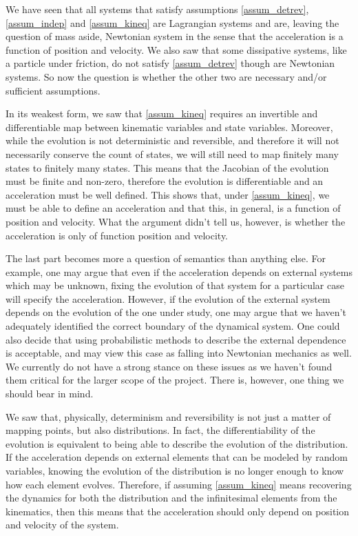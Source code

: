 We have seen that all systems that satisfy assumptions \ref{assum_detrev}, \ref{assum_indep} and \ref{assum_kineq} are Lagrangian systems and are, leaving the question of mass aside, Newtonian system in the sense that the acceleration is a function of position and velocity. We also saw that some dissipative systems, like a particle under friction, do not satisfy \ref{assum_detrev} though are Newtonian systems. So now the question is whether the other two are necessary and/or sufficient assumptions.

In its weakest form, we saw that \ref{assum_kineq} requires an invertible and differentiable map between kinematic variables and state variables. Moreover, while the evolution is not deterministic and reversible, and therefore it will not necessarily conserve the count of states, we will still need to map finitely many states to finitely many states. This means that the Jacobian of the evolution must be finite and non-zero, therefore the evolution is differentiable and an acceleration must be well defined. This shows that, under \ref{assum_kineq}, we must be able to define an acceleration and that this, in general, is a function of position and velocity. What the argument didn't tell us, however, is whether the acceleration is only of function position and velocity.

The last part becomes more a question of semantics than anything else. For example, one may argue that even if the acceleration depends on external systems which may be unknown, fixing the evolution of that system for a particular case will specify the acceleration. However, if the evolution of the external system depends on the evolution of the one under study, one may argue that we haven't adequately identified the correct boundary of the dynamical system. One could also decide that using probabilistic methods to describe the external dependence is acceptable, and may view this case as falling into Newtonian mechanics as well. We currently do not have a strong stance on these issues as we haven't found them critical for the larger scope of the project. There is, however, one thing we should bear in mind.

We saw that, physically, determinism and reversibility is not just a matter of mapping points, but also distributions. In fact, the differentiability of the evolution is equivalent to being able to describe the evolution of the distribution. If the acceleration depends on external elements that can be modeled by random variables, knowing the evolution of the distribution is no longer enough to know how each element evolves. Therefore, if assuming \ref{assum_kineq} means recovering the dynamics for both the distribution and the infinitesimal elements from the kinematics, then this means that the acceleration should only depend on position and velocity of the system.


